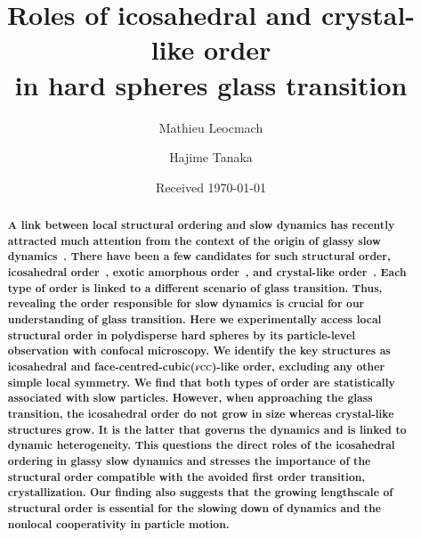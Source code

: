 


\title{Roles of icosahedral and crystal-like order \\ in hard spheres glass transition} 


\author{Mathieu Leocmach} 

\author{Hajime Tanaka}

\date{Received \today}

\begin{abstract}
\textbf{
A link between local structural ordering and slow dynamics has recently attracted much attention from the context of the origin of glassy slow dynamics~\citep{cavagna2009supercooled,BerthierR}. There have been a few candidates for such structural order, icosahedral order~\cite{steinhardt1983boo,tarjus2005fba}, exotic amorphous order~\cite{lubchenko2007}, and crystal-like order~\cite{tanaka2010critical}. Each type of order is linked to a different scenario of glass transition. Thus, revealing the order responsible for slow dynamics is crucial for our understanding of glass transition. Here we experimentally access local structural order in polydisperse hard spheres by its particle-level observation with confocal microscopy. We identify the key structures as icosahedral and face-centred-cubic(\textmd{\textsc{fcc}})-like order, excluding any other simple local symmetry. We find that both types of order are statistically associated with slow particles. However, when approaching the glass transition, the icosahedral order do not grow in size whereas crystal-like structures grow. It is the latter that governs the dynamics and is linked to dynamic heterogeneity. This questions the direct roles of the icosahedral ordering in glassy slow dynamics and stresses the importance of the structural order compatible with the avoided first order transition, crystallization. Our finding also suggests that the growing lengthscale of structural order is essential for the slowing down of dynamics and the nonlocal cooperativity in particle motion. 
}
\end{abstract}
\maketitle



